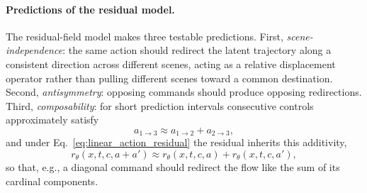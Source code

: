 \documentclass[letterpaper]{article} %
\begin{document}
\paragraph{Predictions of the residual model.} The residual-field model makes three testable predictions. First, \emph{scene-independence}: the same action should redirect the latent trajectory along a consistent direction across different scenes, acting as a relative displacement operator rather than pulling different scenes toward a common destination. Second, \emph{antisymmetry}: opposing commands should produce opposing redirections. Third, \emph{composability}: for short prediction intervals consecutive controls approximately satisfy
\begin{equation}
    a_{1 \rightarrow 3}
    \approx
    a_{1 \rightarrow 2}
    +
    a_{2 \rightarrow 3},
    \label{eq:additive_action_composition}
\end{equation}
and under Eq.~\eqref{eq:linear_action_residual} the residual inherits this additivity,
\begin{equation}
    r_\theta(x,t,c,a+a')
    \approx
    r_\theta(x,t,c,a)
    +
    r_\theta(x,t,c,a'),
    \label{eq:additive_residual}
\end{equation}
so that, e.g., a diagonal command should redirect the flow like the sum of its cardinal components.
\end{document}
